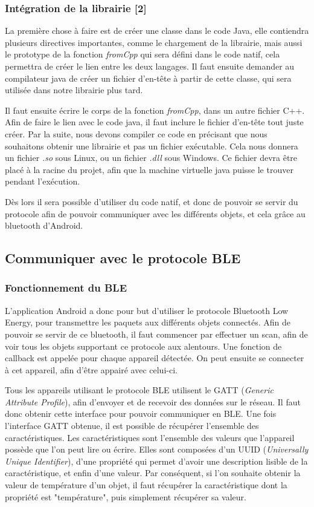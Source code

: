 \subsubsection{Intégration de la librairie [2]}
La première chose à faire est de créer une classe dans le code Java, elle contiendra plusieurs directives 
importantes, comme le chargement de la librairie, mais aussi le prototype de la fonction \emph{fromCpp} qui 
sera défini dans le code natif, cela permettra de créer le lien entre les deux langages. Il faut ensuite 
demander au compilateur java de créer un fichier d'en-tête à partir de cette classe, qui sera utilisée dans 
notre librairie plus tard.

Il faut ensuite écrire le corps de la fonction \emph{fromCpp}, dans un autre fichier C++. Afin de faire le 
lien avec le code java, il faut inclure le fichier d'en-tête tout juste créer. Par la suite, nous devons 
compiler ce code en précisant que nous souhaitons obtenir une librairie et pas un fichier exécutable. Cela 
nous donnera un fichier \emph{.so} sous Linux, ou un fichier \emph{.dll} sous Windows. Ce fichier devra 
être placé à la racine du projet, afin que la machine virtuelle java puisse le trouver pendant l'exécution.

Dès lors il sera possible d'utiliser du code natif, et donc de pouvoir se servir du protocole afin 
de pouvoir communiquer avec les différents objets, et cela grâce au bluetooth d'Android.


	\subsection{Communiquer avec le protocole BLE}
	  \subsubsection{Fonctionnement du BLE}
L'application Android a donc pour but d'utiliser le protocole Bluetooth Low Energy, pour transmettre les 
paquets aux différents objets connectés. Afin de pouvoir se servir de ce bluetooth, il faut commencer par 
effectuer un scan, afin de voir tous les objets supportant ce protocole aux alentours. Une fonction de 
callback est appelée pour chaque appareil détectée. On peut ensuite se connecter à cet appareil, afin d'être 
appairé avec celui-ci.

Tous les appareils utilisant le protocole BLE utilisent le GATT (\emph{Generic Attribute Profile}), afin 
d'envoyer et de recevoir des données sur le réseau. Il faut donc obtenir cette interface pour pouvoir 
communiquer en BLE. Une fois l'interface GATT obtenue, il est possible de récupérer l'ensemble des 
caractéristiques. Les caractéristiques sont l'ensemble des valeurs que l'appareil possède que l'on peut lire 
ou écrire. Elles sont composées d'un UUID (\emph{Universally Unique Identifier}), d'une propriété qui permet 
d'avoir une description lisible de la caractéristique, et enfin d'une valeur. Par conséquent, si l'on souhaite 
obtenir la valeur de température d'un objet, il faut récupérer la caractéristique dont la propriété est 
"température", puis simplement récupérer sa valeur.

